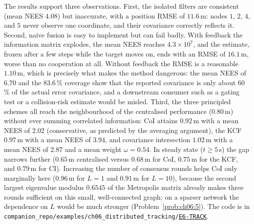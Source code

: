 \documentclass[graybox,envcountchap]{style/SNmono}
\newcommand{\repopath}[1]{\texttt{#1}}
\providecommand{\DIFadd}[1]{{\protect\color{blue} #1}} %
\providecommand{\DIFdel}[1]{{\protect\color{red} #1}} %
\DeclareRobustCommand{\RtwoDel}[1]{{\color{red}%
  \renewcommand{\DIFadd}[1]{##1}\renewcommand{\DIFdel}[1]{##1}%
  #1}}
\DeclareRobustCommand{\RtwoAdd}[1]{{\color{blue}#1}}
\DeclareRobustCommand{\codeentry}[1]{\hyperref[code:#1]{\texttt{#1}}}
\begin{document}
\begin{example}
The results support three observations. First, the isolated filters are consistent (mean NEES $4.08$) but inaccurate, with a position RMSE of $11.6$\,m: nodes $1$, $2$, $4$, and $5$ never observe one coordinate, and their covariance correctly reflects it. Second, naive fusion is easy to implement but can fail badly. With feedback the information matrix explodes, the mean NEES reaches $4.3\times10^{7}$, and the estimate, frozen after a few steps while the target moves on, ends with an RMSE of $16.1$\,m, worse than no cooperation at all. Without feedback the RMSE is a reasonable $1.10$\,m, which is precisely what makes the method dangerous: the mean NEES of $6.70$ and the $83.6\,\%$ coverage show that the reported covariance is only about 60\,\% of the actual error covariance, and a downstream consumer such as a gating test or a collision-risk estimate would be misled. Third, the three principled schemes all reach the neighbourhood of the centralised performance ($0.80$\,m) without ever summing correlated information: CoI attains $0.92$\,m with a mean NEES of $2.02$ (conservative, as predicted by the averaging argument), the KCF $0.97$\,m with a mean NEES of $3.94$, and covariance intersection $1.02$\,m with a mean NEES of $2.87$ and a mean weight $\omega=0.54$. In steady state ($t\ge5$\,s) the gap narrows further ($0.65$\,m centralised versus $0.68$\,m for CoI, $0.75$\,m for the KCF, and $0.79$\,m for CI). Increasing the number of consensus rounds helps CoI only marginally here ($0.96$\,m for $L=1$ and $0.91$\,m for $L=10$), because the second largest eigenvalue modulus $0.6545$ of the Metropolis matrix already makes three rounds sufficient on this small, well-connected graph; on a sparser network the dependence on $L$ would be much stronger (Problem~\ref{prob:ch06:5}). The code is in \RtwoDel{\repopath{companion\_\allowbreak repo/\allowbreak examples/\allowbreak ch06\_\allowbreak distributed\_\allowbreak tracking/\allowbreak }}\RtwoAdd{\codeentry{E6-TRACK}}.
\end{example}
\end{document}
